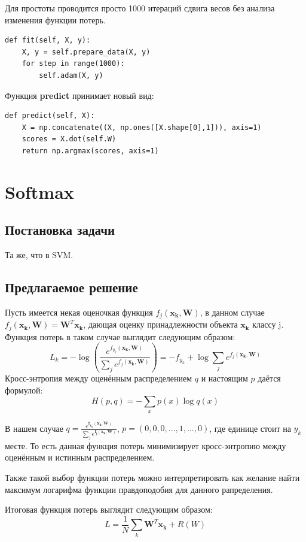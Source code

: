 \documentclass[a4paper]{article}
\newcommand{\xk}{\bm{x_k}}
\newcommand{\W}{\bm{W}}
\begin{document}
Для простоты проводится просто 1000 итераций сдвига весов без анализа изменения функции потерь.
\begin{lstlisting}
def fit(self, X, y):
	X, y = self.prepare_data(X, y)
	for step in range(1000):
		self.adam(X, y)
\end{lstlisting}

Функция \textbf{predict} принимает новый вид:
\begin{lstlisting}
def predict(self, X):
	X = np.concatenate((X, np.ones([X.shape[0],1])), axis=1)
	scores = X.dot(self.W)
	return np.argmax(scores, axis=1)
\end{lstlisting}


\section{Softmax}
\subsection{Постановка задачи}
Та же, что в SVM.
\subsection{Предлагаемое решение}
Пусть имеется некая оценочкая функция $f_j(\xk, \W)$, в данном случае $f_j(\xk, \W) = \W^T\xk$, дающая оценку принадлежности объекта $\xk$ классу j. Функция потерь в таком случае выглядит следующим образом:
\begin{equation}
L_k = - \log\left(\frac{e^{f_{y_k}(\xk, \W)}}{\sum_je^{f_j(\xk, \W)}}\right) = 
- f_{y_k} + \log\sum_je^{f_j(\xk, \W)}
\end{equation}
Кросс-энтропия между оценённым распределением $q$ и настоящим $p$ даётся формулой:
\begin{equation}
H(p, q) = - \sum_x p(x)\log q(x)
\end{equation}

В нашем случае $q = \frac{e^{\bm{f_{y_k}(\xk, \W)}}}{\sum_je^{\bm{f_j(\xk, \W)}}}$, $p = (0,0,0,..., 1, ..., 0)$, где единице стоит на $y_k$ месте. То есть данная функция потерь минимизирует кросс-энтропию между оценённым и истинным распределением.

Также такой выбор функции потерь можно интерпретировать как желание найти максимум логарифма функции правдоподобия для данного рапределения.

Итоговая функция потерь выглядит следующим образом:
\begin{equation}
L = \frac{1}{N}\sum_k \W^T\xk + R(W)
\end{equation}
\end{document}
